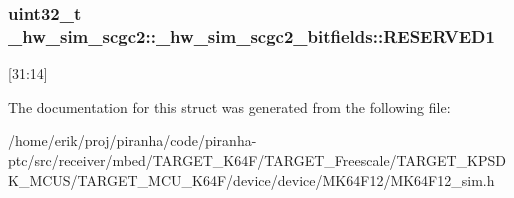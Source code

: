 \subsubsection[{\texorpdfstring{R\+E\+S\+E\+R\+V\+E\+D1}{RESERVED1}}]{\setlength{\rightskip}{0pt plus 5cm}uint32\+\_\+t \+\_\+hw\+\_\+sim\+\_\+scgc2\+::\+\_\+hw\+\_\+sim\+\_\+scgc2\+\_\+bitfields\+::\+R\+E\+S\+E\+R\+V\+E\+D1}\hypertarget{struct__hw__sim__scgc2_1_1__hw__sim__scgc2__bitfields_af5ec9783dab68b6ddf9cdba04bb64245}{}\label{struct__hw__sim__scgc2_1_1__hw__sim__scgc2__bitfields_af5ec9783dab68b6ddf9cdba04bb64245}
\mbox{[}31\+:14\mbox{]} 

The documentation for this struct was generated from the following file\+:\begin{DoxyCompactItemize}
\item 
/home/erik/proj/piranha/code/piranha-\/ptc/src/receiver/mbed/\+T\+A\+R\+G\+E\+T\+\_\+\+K64\+F/\+T\+A\+R\+G\+E\+T\+\_\+\+Freescale/\+T\+A\+R\+G\+E\+T\+\_\+\+K\+P\+S\+D\+K\+\_\+\+M\+C\+U\+S/\+T\+A\+R\+G\+E\+T\+\_\+\+M\+C\+U\+\_\+\+K64\+F/device/device/\+M\+K64\+F12/M\+K64\+F12\+\_\+sim.\+h\end{DoxyCompactItemize}
